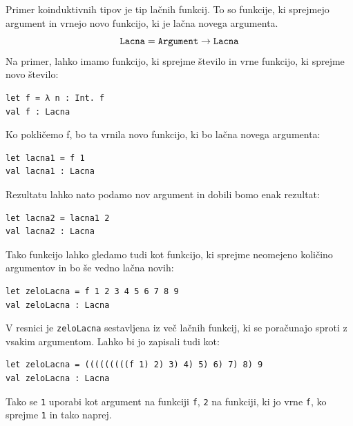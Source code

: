 \documentclass[a4paper,12pt,openright]{book}
\begin{document}
Primer koinduktivnih tipov je tip lačnih funkcij. To so funkcije, ki sprejmejo argument in vrnejo novo funkcijo, ki je lačna novega argumenta.
\begin{equation}
    \mathtt{Lacna} = \mathtt{Argument} \rightarrow \mathtt{Lacna} \notag
\end{equation}
Na primer, lahko imamo funkcijo, ki sprejme število in vrne funkcijo, ki sprejme novo število:
\begin{lstlisting}
let f = λ n : Int. f
val f : Lacna  
\end{lstlisting}
Ko pokličemo f, bo ta vrnila novo funkcijo, ki bo lačna novega argumenta:
\begin{lstlisting}
let lacna1 = f 1
val lacna1 : Lacna
\end{lstlisting}
Rezultatu lahko nato podamo nov argument in dobili bomo enak rezultat:
\begin{lstlisting}
let lacna2 = lacna1 2
val lacna2 : Lacna  
\end{lstlisting}
Tako funkcijo lahko gledamo tudi kot funkcijo, ki sprejme neomejeno količino argumentov in bo še vedno lačna novih:
\begin{lstlisting}
let zeloLacna = f 1 2 3 4 5 6 7 8 9
val zeloLacna : Lacna
\end{lstlisting}
V resnici je \lstinline{zeloLacna} sestavljena iz več lačnih funkcij, ki se poračunajo sproti z vsakim argumentom. Lahko bi jo zapisali tudi kot:
\begin{lstlisting}
let zeloLacna = (((((((((f 1) 2) 3) 4) 5) 6) 7) 8) 9
val zeloLacna : Lacna
\end{lstlisting}
Tako se \lstinline{1} uporabi kot argument na funkciji \lstinline{f}, \lstinline{2} na funkciji, ki jo vrne \lstinline{f}, ko sprejme \lstinline{1} in tako naprej.
\end{document}
